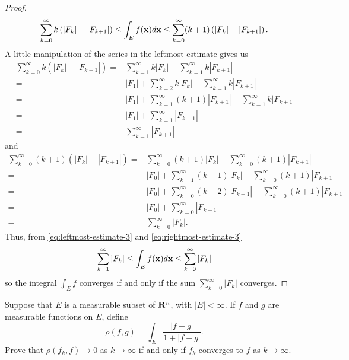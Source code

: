 \begin{proof}
\begin{equation}
\sum_{k=0}^\infty k\left(|F_k|-|F_{k+1}|\right)\leq
\int_E f(\mathbf{x}) d \mathbf{x}\leq
\sum_{k=0}^\infty (k+1)\left(|F_k|-|F_{k+1}|\right).
\end{equation}
A little manipulation of the series in the leftmost estimate gives us
\begin{equation}
\label{eq:leftmost-estimate-3}
\begin{aligned}
\sum_{k=0}^\infty k\left(|F_k|-|F_{k+1}|\right)
={}&\sum_{k=1}^\infty k|F_k|-\sum_{k=1}^\infty k|F_{k+1}|\\
={}&|F_1|+\sum_{k=2}^\infty k|F_k|-\sum_{k=1}^\infty k|F_{k+1}|\\
={}&|F_1|+\sum_{k=1}^\infty(k+1)|F_{k+1}|-\sum_{k=1}^\infty k|F_{k+1}\\
={}&|F_1|+\sum_{k=1}^\infty |F_{k+1}|\\
={}&\sum_{k=1}^\infty|F_{k+1}|
\end{aligned}
\end{equation}
and
\begin{equation}
\label{eq:rightmost-estimate-3}
\begin{aligned}
\sum_{k=0}^\infty(k+1)\left(|F_k|-|F_{k+1}|\right)
={}&\sum_{k=0}^\infty(k+1)|F_k|-\sum_{k=0}^\infty(k+1)|F_{k+1}|\\
={}&|F_0|+\sum_{k=1}^\infty(k+1)|F_k|-\sum_{k=0}^\infty(k+1)|F_{k+1}|\\
={}&|F_0|+\sum_{k=0}^\infty(k+2)|F_{k+1}|-\sum_{k=0}^\infty(k+1)|F_{k+1}|\\
={}&|F_0|+\sum_{k=0}^\infty|F_{k+1}|\\
={}&\sum_{k=0}^\infty|F_k|.
\end{aligned}
\end{equation}
Thus, from \eqref{eq:leftmost-estimate-3} and
\eqref{eq:rightmost-estimate-3}
\begin{equation}
\label{eq:final-upper-lower-estimates-3}
\sum_{k=1}^\infty|F_k|\leq\int_E f(\mathbf{x}) d \mathbf{x}\leq\sum_{k=0}^\infty|F_k|
\end{equation}
so the integral $\int_E f$ converges if and only if the sum
$\sum_{k=0}^\infty|F_k|$ converges.
\end{proof}
\begin{problem}
Suppose that $E$ is a measurable subset of $\mathbf{R}^n$, with
$|E|<\infty$. If $f$ and $g$ are measurable functions on
$E$, define
\[
\rho(f,g)=\int_E\frac{|f-g|}{1+|f-g|}.
\]
Prove that $\rho(f_k,f)\to 0$ as $k\to\infty$ if and only if $f_k$
converges to $f$ as $k\to\infty$.
\end{problem}
